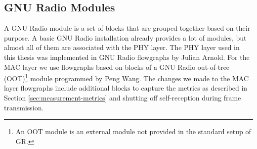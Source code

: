 \subsection{GNU Radio Modules}
A GNU Radio module is a set of blocks that are grouped together based on their purpose. A basic GNU Radio installation already provides a lot of modules, but almost all of them are associated with the PHY layer. The PHY layer used in this thesis was implemented in GNU Radio flowgraphs by Julian Arnold. For the MAC layer we use flowgraphs based on blocks of a GNU Radio out-of-tree (OOT)\footnote{An OOT module is an external module not provided in the standard setup of GR.} module programmed by Peng Wang. The changes we made to the MAC layer flowgraphs include additional blocks to capture the metrics as described in Section \ref{sec:measurement-metrics} and shutting off self-reception during frame transmission. 